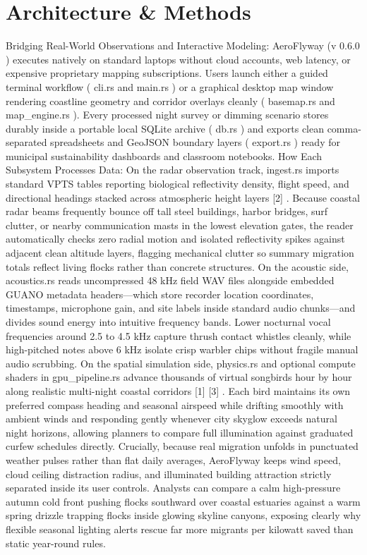 \documentclass[10pt,letterpaper]{article}
\begin{document}
\section{Architecture \& Methods}
Bridging Real-World Observations and Interactive Modeling: AeroFlyway (v 0.6.0 ) executes natively on standard laptops without cloud accounts, web latency, or expensive proprietary mapping subscriptions. Users launch either a guided terminal workflow ( cli.rs and main.rs ) or a graphical desktop map window rendering coastline geometry and corridor overlays cleanly ( basemap.rs and map\_engine.rs ). Every processed night survey or dimming scenario stores durably inside a portable local SQLite archive ( db.rs ) and exports clean comma-separated spreadsheets and GeoJSON boundary layers ( export.rs ) ready for municipal sustainability dashboards and classroom notebooks. How Each Subsystem Processes Data: On the radar observation track, ingest.rs imports standard VPTS tables reporting biological reflectivity density, flight speed, and directional headings stacked across atmospheric height layers [2] . Because coastal radar beams frequently bounce off tall steel buildings, harbor bridges, surf clutter, or nearby communication masts in the lowest elevation gates, the reader automatically checks zero radial motion and isolated reflectivity spikes against adjacent clean altitude layers, flagging mechanical clutter so summary migration totals reflect living flocks rather than concrete structures. On the acoustic side, acoustics.rs reads uncompressed 48 kHz field WAV files alongside embedded GUANO metadata headers---which store recorder location coordinates, timestamps, microphone gain, and site labels inside standard audio chunks---and divides sound energy into intuitive frequency bands. Lower nocturnal vocal frequencies around 2.5 to 4.5 kHz capture thrush contact whistles cleanly, while high-pitched notes above 6 kHz isolate crisp warbler chips without fragile manual audio scrubbing. On the spatial simulation side, physics.rs and optional compute shaders in gpu\_pipeline.rs advance thousands of virtual songbirds hour by hour along realistic multi-night coastal corridors [1] [3] . Each bird maintains its own preferred compass heading and seasonal airspeed while drifting smoothly with ambient winds and responding gently whenever city skyglow exceeds natural night horizons, allowing planners to compare full illumination against graduated curfew schedules directly. Crucially, because real migration unfolds in punctuated weather pulses rather than flat daily averages, AeroFlyway keeps wind speed, cloud ceiling distraction radius, and illuminated building attraction strictly separated inside its user controls. Analysts can compare a calm high-pressure autumn cold front pushing flocks southward over coastal estuaries against a warm spring drizzle trapping flocks inside glowing skyline canyons, exposing clearly why flexible seasonal lighting alerts rescue far more migrants per kilowatt saved than static year-round rules.
\end{document}

